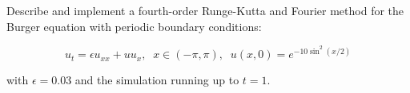 Describe and implement a fourth-order Runge-Kutta and Fourier method for the Burger equation with
periodic boundary conditions:

$$u_t = \epsilon u_{xx} + uu_x,\;\;x\in(-\pi,\pi),\;\;u(x,0) = e^{-10\sin^2(x/2)}$$

with $\epsilon = 0.03$ and the simulation running up to $t = 1$.